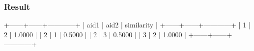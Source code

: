 \documentclass[letterpaper, 12pt]{report}
\begin{document}
	\subsubsection{Result}
	\begin{spverbatim}
		+------+------+------------+
		| aid1 | aid2 | similarity |
		+------+------+------------+
		|    1 |    2 | 1.0000     |
		|    2 |    1 | 0.5000     |
		|    2 |    3 | 0.5000     |
		|    3 |    2 | 1.0000     |
		+------+------+------------+
	\end{spverbatim}
	
	
\end{document}
